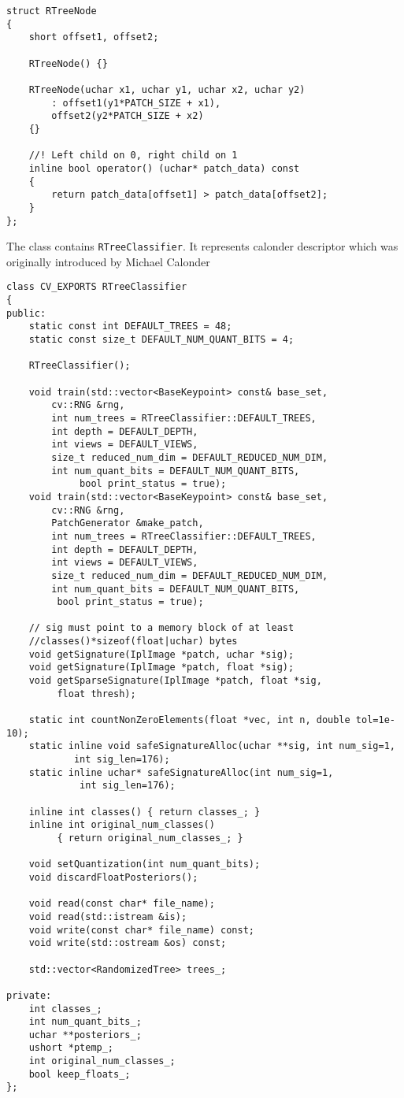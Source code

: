 \begin{lstlisting}
struct RTreeNode
{
	short offset1, offset2;

	RTreeNode() {}

	RTreeNode(uchar x1, uchar y1, uchar x2, uchar y2)
		: offset1(y1*PATCH_SIZE + x1),
		offset2(y2*PATCH_SIZE + x2)
	{}

	//! Left child on 0, right child on 1
	inline bool operator() (uchar* patch_data) const
	{
		return patch_data[offset1] > patch_data[offset2];
	}
};
\end{lstlisting}


The class contains \texttt{RTreeClassifier}. It represents calonder descriptor which was originally introduced by Michael Calonder

\begin{lstlisting}
class CV_EXPORTS RTreeClassifier
{   
public:
	static const int DEFAULT_TREES = 48;
	static const size_t DEFAULT_NUM_QUANT_BITS = 4;  

	RTreeClassifier();

	void train(std::vector<BaseKeypoint> const& base_set, 
		cv::RNG &rng,
		int num_trees = RTreeClassifier::DEFAULT_TREES,
		int depth = DEFAULT_DEPTH,
		int views = DEFAULT_VIEWS,
		size_t reduced_num_dim = DEFAULT_REDUCED_NUM_DIM,
		int num_quant_bits = DEFAULT_NUM_QUANT_BITS,
			 bool print_status = true);
	void train(std::vector<BaseKeypoint> const& base_set,
		cv::RNG &rng, 
		PatchGenerator &make_patch,
		int num_trees = RTreeClassifier::DEFAULT_TREES,
		int depth = DEFAULT_DEPTH,
		int views = DEFAULT_VIEWS,
		size_t reduced_num_dim = DEFAULT_REDUCED_NUM_DIM,
		int num_quant_bits = DEFAULT_NUM_QUANT_BITS,
		 bool print_status = true);

	// sig must point to a memory block of at least 
	//classes()*sizeof(float|uchar) bytes
	void getSignature(IplImage *patch, uchar *sig);
	void getSignature(IplImage *patch, float *sig);
	void getSparseSignature(IplImage *patch, float *sig,
		 float thresh);
		 
	static int countNonZeroElements(float *vec, int n, double tol=1e-10);
	static inline void safeSignatureAlloc(uchar **sig, int num_sig=1,
			int sig_len=176);
	static inline uchar* safeSignatureAlloc(int num_sig=1,
			 int sig_len=176);  

	inline int classes() { return classes_; }
	inline int original_num_classes()
		 { return original_num_classes_; }

	void setQuantization(int num_quant_bits);
	void discardFloatPosteriors();

	void read(const char* file_name);
	void read(std::istream &is);
	void write(const char* file_name) const;
	void write(std::ostream &os) const;

	std::vector<RandomizedTree> trees_;

private:    
	int classes_;
	int num_quant_bits_;
	uchar **posteriors_;
	ushort *ptemp_;
	int original_num_classes_;  
	bool keep_floats_;
};
\end{lstlisting}


